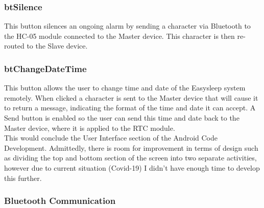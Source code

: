 \documentclass[12pt,a4paper]{article}
\begin{document}
    \subsubsection*{btSilence}
    This button silences an ongoing alarm by sending a character via Bluetooth to the HC-05 module connected to the Master device. This character is then re-routed to the Slave device.
    
    \subsubsection*{btChangeDateTime}
    This button allows the user to change time and date of the Easysleep system remotely. When clicked a character is sent to the Master device that will cause it to return a message, indicating the format of the time and date it can accept. A Send button is enabled so the user can send this time and date back to the Master device, where it is applied to the RTC module. \\
    
    This would conclude the User Interface section of the Android Code Development. Admittedly, there is room for improvement in terms of design such as dividing the top and bottom section of the screen into two separate activities, however due to current situation (Covid-19) I didn't have enough time to develop this further. \\
    \newpage
    
   \subsubsection{Bluetooth Communication}\label{section:btCommunication}
   ~\cite{bib:acceptThread, bib:connectThread, bib:connectedThread, bib:tyingUp, bib:uiLink, bib:androidDev}
   
\end{document}
